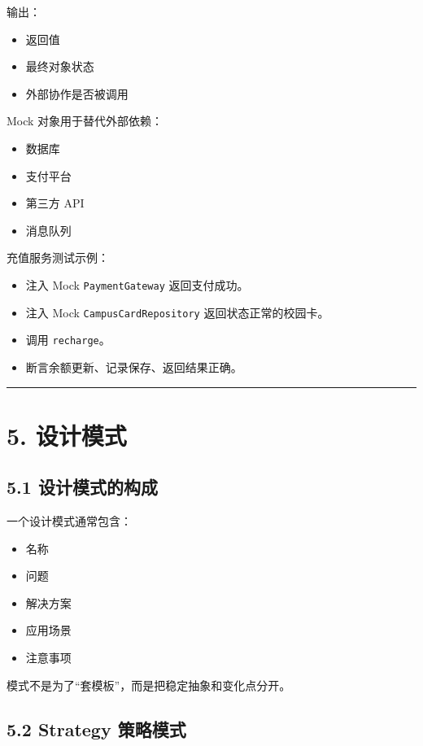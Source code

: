 \documentclass[UTF8,zihao=-4]{ctexart}
\begin{document}
输出：

\begin{itemize}
\item 返回值
\item 最终对象状态
\item 外部协作是否被调用
\end{itemize}

Mock 对象用于替代外部依赖：

\begin{itemize}
\item 数据库
\item 支付平台
\item 第三方 API
\item 消息队列
\end{itemize}

充值服务测试示例：

\begin{itemize}
\item 注入 Mock \texttt{PaymentGateway} 返回支付成功。
\item 注入 Mock \texttt{CampusCardRepository} 返回状态正常的校园卡。
\item 调用 \texttt{recharge}。
\item 断言余额更新、记录保存、返回结果正确。
\end{itemize}

\bigskip\hrule\bigskip

\section{5. 设计模式}

\subsection{5.1 设计模式的构成}

一个设计模式通常包含：

\begin{itemize}
\item 名称
\item 问题
\item 解决方案
\item 应用场景
\item 注意事项
\end{itemize}

模式不是为了“套模板”，而是把稳定抽象和变化点分开。

\subsection{5.2 Strategy 策略模式}
\end{document}
